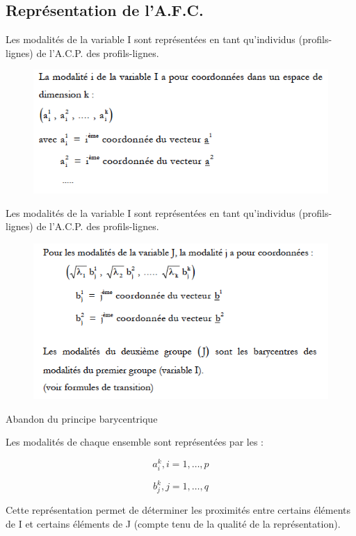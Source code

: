 \documentclass[12pt]{beamer}
\begin{document}
\subsection{Représentation de l'A.F.C.}

\begin{frame}{Les modalités de la variable I sont représentées en tant qu’individus (profils-lignes) de l’A.C.P. des profils-lignes.}

\begin{figure}
\includegraphics[scale=0.6]{exemple14.png}  
\end{figure}

\end{frame}

\begin{frame}{Les modalités de la variable I sont représentées en tant qu’individus (profils-lignes) de l’A.C.P. des profils-lignes.}

\begin{figure}
\includegraphics[scale=0.6]{exemple15.png}  
\end{figure}

\end{frame}

\begin{frame}{Abandon du principe barycentrique}

Les modalités de chaque ensemble sont représentées par les :

$$a^k_i,  i=1, \ldots, p$$

$$b^k_j ,  j=1, \ldots, q $$

Cette représentation permet de déterminer les proximités entre
certains éléments de I et certains éléments de J (compte tenu de la
qualité de la représentation).

\end{frame}
\end{document}
